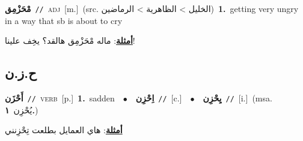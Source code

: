 \documentclass[10pt,a4paper,twoside]{article} %
\begin{document}
\begin{multicols}{2}
{\setlength\topsep{0pt}\textbf{\foreignlanguage{arabic}{مْحَزْمِق}}\ {\color{gray}\texttt{//}\color{black}}\ \textsc{adj}\ [m.]\ (src. \color{gray}\foreignlanguage{arabic}{الخليل > الظاهرية > الرماضين}\color{black})\ \textbf{1.}~getting very ungry in a way that sb is about to cry\  \begin{flushright}\color{gray}\foreignlanguage{arabic}{\textbf{\underline{\foreignlanguage{arabic}{أمثلة}}}: ماله مْحَزْمِق هالقد؟ يخِف علينا!}\end{flushright}\color{black}} \vspace{2mm}

\vspace{-3mm}
\subsection*{\color{blue}\foreignlanguage{arabic}{ح.ز.ن}\color{blue}{}} 

{\setlength\topsep{0pt}\textbf{\foreignlanguage{arabic}{أَحْزَن}}\ {\color{gray}\texttt{//}\color{black}}\ \textsc{verb}\ [p.]\ \textbf{1.}~sadden\ \ $\bullet$\ \ \setlength\topsep{0pt}\textbf{\foreignlanguage{arabic}{اِحْزِن}}\ {\color{gray}\texttt{//}\color{black}}\ [c.]\ \ $\bullet$\ \ \setlength\topsep{0pt}\textbf{\foreignlanguage{arabic}{يِحْزِن}}\ {\color{gray}\texttt{//}\color{black}}\ [i.]\ \color{gray}(msa. \foreignlanguage{arabic}{يُحْزِن}~\foreignlanguage{arabic}{\textbf{١.}})\color{black}\  \begin{flushright}\color{gray}\foreignlanguage{arabic}{\textbf{\underline{\foreignlanguage{arabic}{أمثلة}}}: هاي العمايل بطلعت تِحْزِنني}\end{flushright}\color{black}} \vspace{2mm}


\end{multicols}
\end{document}
